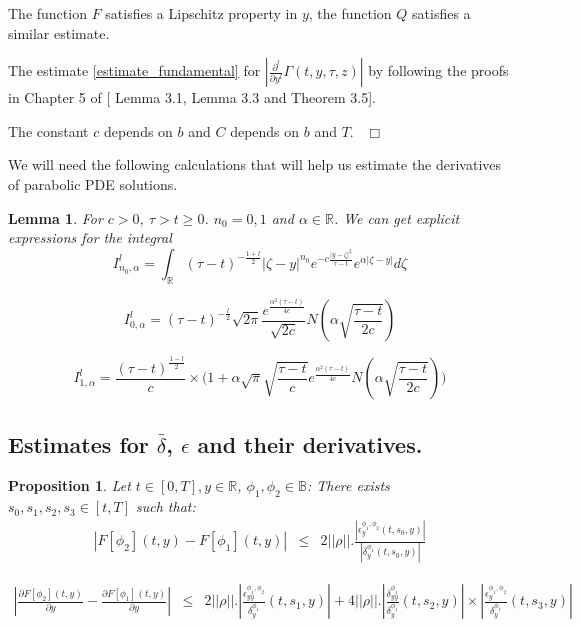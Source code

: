 \documentclass[11pt, psfig]{article}
\newtheorem{lemma}[theorem]{Lemma}
\newtheorem{proposition}[theorem]{Proposition}
\theoremstyle{definition}
\theoremstyle{remark}
\numberwithin{equation}{section}
\def\sR{\mathbb{R}}
\def\sR{\mathbb{R}}
\def \ep{\hbox{ }\hfill$\Box$}
\begin{document}
The function $F$ satisfies a Lipschitz property in $y$, the function $Q$ satisfies a similar estimate.

The estimate \eqref{estimate_fundamental}  for $|\frac{\partial^l}{\partial y^l} \Gamma(t,y, \tau, z) |$ by following the proofs in Chapter 5 of \cite{Ga_Me1} [ Lemma 3.1, Lemma 3.3 and Theorem 3.5].

The constant $c$ depends on $b$ and $C$ depends on $b$ and $T$.
\ep


We will need the following calculations that will help us estimate the derivatives of parabolic PDE solutions.
\begin{lemma}\label{integral_exp}
For $ c >0$, $\tau>t\geq 0$.   $n_0 = 0, 1$ and $\alpha \in \sR$.
We  can get explicit expressions for the integral
\begin{equation}
I_{n_0, \alpha}^l = \int_{\sR}  (\tau-t)^{-\frac{1+l}{2}} |\zeta-y|^{n_0} e^{-c \frac{|y-\zeta|^2}{\tau-t} } e^{\alpha |\zeta-y|}d\zeta  
\end{equation}

\begin{equation}
I_{0, \alpha}^l =  (\tau-t)^{-\frac{l}{2}}\sqrt{ 2\pi} \frac{ e^{\frac{\alpha^2(\tau-t) }{4c}}}{\sqrt{2c}} N(\alpha \sqrt{\frac{\tau-t}{2c}}) 
\end{equation}

\begin{equation}
I_{1, \alpha}^l =\frac{  (\tau-t)^{\frac{1-l}{2}}}{c} \times \bigg(1+ \alpha \sqrt{ \pi} \sqrt{\frac{\tau-t}{c}}e^{\frac{\alpha^2(\tau-t) }{4c}} N(\alpha \sqrt{\frac{\tau-t}{2c}})  \bigg)
\end{equation}

\end{lemma}


\subsection*{Estimates for $\bar{\delta}$, $\epsilon$ and their derivatives.}
\begin{proposition}\label{estimates_deltaF}
Let $t\in [0,T], y\in \sR$, $\phi_1, \phi_2 \in \mathbb{B}$:
There exists $s_0, s_1, s_2, s_3\in [t,T]$ such that:
\begin{eqnarray}\label{delta_F}
 | F[\phi_2](t,y) - F[\phi_{1}](t,y)|& \leq & 2||\rho|| .  \frac{|\epsilon_y^{\phi_1, \phi_2}(t,s_0,y)|}{ |\delta_y^{\phi_1}(t,s_0,y)|} 
\end{eqnarray}

\begin{eqnarray}\label{delta_Fy}
| \frac{\partial F[\phi_2](t,y)}{\partial y}-\frac{\partial F[\phi_1](t,y)}{\partial y} | & \leq &  2||\rho|| . |  \frac{\epsilon_{yy}^{\phi_1,\phi_2}}{\delta_y^{\phi_1}}(t,s_1,y)|
+ 
4||\rho|| . |\frac{\delta_{yy}^{\phi_1}}{\delta_y^{\phi_1}}(t,s_2,y)| \times |\frac{\epsilon_y^{\phi_1,\phi_2}}{\delta_y^{\phi_1}}(t,s_3,y)|
\end{eqnarray}
\end{proposition}
\end{document}
